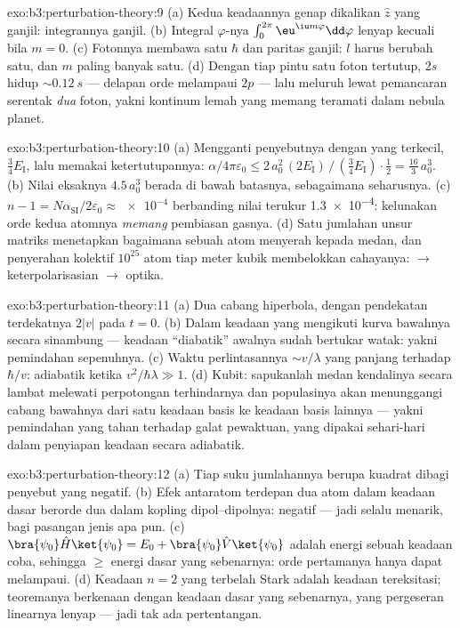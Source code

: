 \begin{solution}{exo:b3:perturbation-theory:9}
(a) Kedua keadaannya genap dikalikan $\hat z$ yang ganjil: integrannya
ganjil. (b) Integral $\varphi$-nya $\int_0^{2\pi}\eu^{\iu m\varphi}\dd\varphi$
lenyap kecuali bila $m = 0$. (c) Fotonnya membawa satu $\hbar$ dan
paritas ganjil: $l$ harus berubah satu, dan $m$ paling banyak satu. (d)
Dengan tiap pintu satu foton tertutup, $2s$ hidup $\sim\qty{0.12}{s}$ ---
delapan orde melampaui $2p$ --- lalu meluruh lewat pemancaran serentak
\emph{dua} foton, yakni kontinum lemah yang memang teramati dalam nebula
planet.
\end{solution}

\begin{solution}{exo:b3:perturbation-theory:10}
(a) Mengganti penyebutnya dengan yang terkecil, $\tfrac34
E_{\text{I}}$, lalu memakai ketertutupannya: $\alpha/4\pi\varepsilon_0 \le
2\,a_0^2\,(2E_{\text{I}})\,/\,(\tfrac34 E_{\text{I}})\cdot\tfrac12
= \tfrac{16}3\,a_0^3$. (b) Nilai eksaknya $4.5\,a_0^3$ berada di bawah
batasnya, sebagaimana seharusnya. (c) $n - 1 = N\alpha_{\text{SI}}/2\varepsilon_0
\approx \num{e-4}$ berbanding nilai terukur \num{1.3e-4}: kelunakan
orde kedua atomnya \emph{memang} pembiasan gasnya. (d) Satu jumlahan
unsur matriks menetapkan bagaimana sebuah atom menyerah kepada medan,
dan penyerahan kolektif $10^{25}$ atom tiap meter kubik membelokkan
cahayanya:  $\to$ keterpolarisasian $\to$ optika.
\end{solution}

\begin{solution}{exo:b3:perturbation-theory:11}
(a) Dua cabang hiperbola, dengan pendekatan terdekatnya $2|v|$ pada $t = 0$.
(b) Dalam keadaan yang mengikuti kurva bawahnya secara sinambung ---
keadaan ``diabatik'' awalnya sudah bertukar watak: yakni pemindahan
sepenuhnya. (c) Waktu perlintasannya $\sim v/\lambda$ yang panjang
terhadap $\hbar/v$: adiabatik ketika $v^2/\hbar\lambda \gg 1$. (d)
Kubit: sapukanlah medan kendalinya secara lambat melewati perpotongan
terhindarnya dan populasinya akan menunggangi cabang bawahnya dari satu
keadaan basis ke keadaan basis lainnya --- yakni pemindahan yang tahan
terhadap galat pewaktuan, yang dipakai sehari-hari dalam penyiapan
keadaan secara adiabatik.
\end{solution}

\begin{solution}{exo:b3:perturbation-theory:12}
(a) Tiap suku jumlahannya berupa kuadrat dibagi penyebut yang negatif.
(b) Efek antaratom terdepan dua atom dalam keadaan dasar berorde dua
dalam kopling dipol--dipolnya: negatif --- jadi selalu menarik, bagi
pasangan jenis apa pun. (c) $\bra{\psi_0}\hat H\ket{
\psi_0} = E_0 + \bra{\psi_0}\hat V\ket{\psi_0}$ adalah energi sebuah
keadaan coba, sehingga $\ge$ energi dasar yang sebenarnya: orde
pertamanya hanya dapat melampaui. (d) Keadaan $n = 2$ yang terbelah
Stark adalah keadaan tereksitasi; teoremanya berkenaan dengan keadaan
dasar yang sebenarnya, yang pergeseran linearnya lenyap --- jadi tak ada
pertentangan.
\end{solution}

